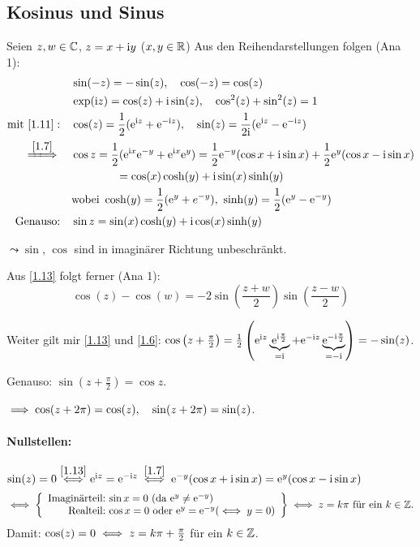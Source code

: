 \documentclass[a4paper,twoside,DIV15,BCOR12mm]{scrbook}
\begin{document}
\subsection{Kosinus und Sinus}

Seien $z,w\in\mathbb{C}$, $z = x +\mathrm{i} y$ ($x,y\in\mathbb{R}$) Aus den Reihendarstellungen folgen (Ana 1):
\begin{align}
\label{1.11}&\sin(-z) = -\sin(z),\quad \cos(-z) = \cos(z)\\
\label{1.12}&\exp(\i z) = \cos(z)+\i\sin(z),\quad\cos^2(z)+\sin^2(z)=1\\
\label{1.13}\text{mit }\eqref{1.11}:\quad&\cos(z) = \frac{1}{2}(\e^{\i z} + \e^{-\i z}),\quad\sin(z) = \frac{1}{2\i}(\e^{\i z} - \e^{-\i z})\\
\folgtwegen{\eqref{1.7}}\quad&\cos z = \frac{1}{2}(\e^{\i x}\e^{-y}+\e^{\i x}\e^y) = \frac{1}{2}\e^{-y}(\cos x + \i\sin x) + \frac{1}{2}\e^y(\cos x-\i\sin x)\nonumber\\
&\qquad\qquad=\cos(x)\cosh(y)+\i\sin(x)\sinh(y)\label{1.14}\\
&\text{wobei } \cosh(y) = \frac{1}{2}(\e^y+e^{-y}),\ \sinh(y) = \frac{1}{2}(\e^y-\e^{-y})\nonumber\\
\label{1.15}\text{Genauso:}\quad&\sin z = \sin(x)\cosh(y) + \i\cos(x)\sinh(y)
\end{align}

$\leadsto\sin$, $\cos$ sind in imaginärer Richtung unbeschränkt.

Aus \eqref{1.13} folgt ferner (Ana 1):
\begin{equation}\label{1.16}
\cos(z)-\cos(w) = -2\sin\left(\frac{z+w}{2}\right)\sin\left(\frac{z-w}{2}\right)
\end{equation}

Weiter gilt mir \eqref{1.13} und \eqref{1.6}: $\cos\left(z+\frac{\pi}{2}\right) = \frac{1}{2}\left(\mathrm{e}^{\mathrm{i} z}\underbrace{\mathrm{e}^{\mathrm{i}\frac{\pi}{2}}}_{=\mathrm{i}} + \mathrm{e}^{-\mathrm{i} z}\underbrace{\mathrm{e}^{-\mathrm{i}\frac{\pi}{2}}}_{=-\mathrm{i}}\right) = -\sin(z)$.

Genauso: $\sin(z+\frac{\pi}{2}) = \cos z$.

$\implies \cos (z+2\pi) = \cos (z),\quad\sin(z+2\pi)= \sin(z)$.

\paragraph{Nullstellen:} $\sin(z) = 0 \stackrel{\eqref{1.13}}{\iff} \mathrm{e}^{\mathrm{i} z} = \mathrm{e}^{-\mathrm{i} z} \stackrel{\eqref{1.7}}{\iff} \mathrm{e}^{-y} (\cos x + \mathrm{i}\sin x) = \mathrm{e}^y (\cos x -\mathrm{i}\sin x)$
\[\gdw \left\{\begin{array}{r @{:\ } l}\text{Imaginärteil}&\sin x = 0\  (\text{da } \e^y\neq\e^{-y})\\\text{Realteil}&\cos x = 0 \text{ oder } \e^y = \e^{-y} (\gdw y=0)\end{array}\right\} \gdw z = k\pi \text{ für ein } k\in\set{Z}.\]
Damit: $\cos(z) = 0\iff z = k\pi+\frac{\pi}{2}$ für ein $k\in\mathbb{Z}$.
\end{document}
